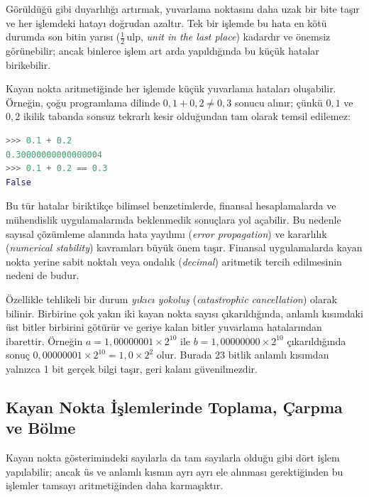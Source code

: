 Görüldüğü gibi duyarlılığı artırmak, yuvarlama noktasını daha uzak bir bite taşır ve her işlemdeki hatayı doğrudan azaltır. Tek bir işlemde bu hata en kötü durumda son bitin yarısı ($\frac{1}{2}\,\text{ulp}$, \emph{unit in the last place}) kadardır ve önemsiz görünebilir; ancak binlerce işlem art arda yapıldığında bu küçük hatalar birikebilir.

\begin{bilginot}
Kayan nokta aritmetiğinde her işlemde küçük yuvarlama hataları oluşabilir. Örneğin, çoğu programlama dilinde $0{,}1 + 0{,}2 \neq 0{,}3$ sonucu alınır; çünkü $0{,}1$ ve $0{,}2$ ikilik tabanda sonsuz tekrarlı kesir olduğundan tam olarak temsil edilemez:

\begin{lstlisting}[language=Python, xleftmargin=2em]
>>> 0.1 + 0.2
0.30000000000000004
>>> 0.1 + 0.2 == 0.3
False
\end{lstlisting}

Bu tür hatalar biriktikçe bilimsel benzetimlerde, finansal hesaplamalarda ve mühendislik uygulamalarında beklenmedik sonuçlara yol açabilir. Bu nedenle sayısal çözümleme alanında hata yayılımı (\emph{error propagation}) ve kararlılık (\emph{numerical stability}) kavramları büyük önem taşır. Finansal uygulamalarda kayan nokta yerine sabit noktalı veya ondalık (\emph{decimal}) aritmetik tercih edilmesinin nedeni de budur.

Özellikle tehlikeli bir durum \emph{yıkıcı yokoluş} (\emph{catastrophic cancellation}) olarak bilinir. Birbirine çok yakın iki kayan nokta sayısı çıkarıldığında, anlamlı kısımdaki üst bitler birbirini götürür ve geriye kalan bitler yuvarlama hatalarından ibarettir. Örneğin $a = 1{,}00000001 \times 2^{10}$ ile $b = 1{,}00000000 \times 2^{10}$ çıkarıldığında sonuç $0{,}00000001 \times 2^{10} = 1{,}0 \times 2^{2}$ olur. Burada 23 bitlik anlamlı kısımdan yalnızca 1 bit gerçek bilgi taşır, geri kalanı güvenilmezdir.
\end{bilginot}

\subsection{Kayan Nokta İşlemlerinde Toplama, Çarpma ve Bölme}

Kayan nokta gösterimindeki sayılarla da tam sayılarla olduğu gibi dört işlem yapılabilir; ancak üs ve anlamlı kısmın ayrı ayrı ele alınması gerektiğinden bu işlemler tamsayı aritmetiğinden daha karmaşıktır.

